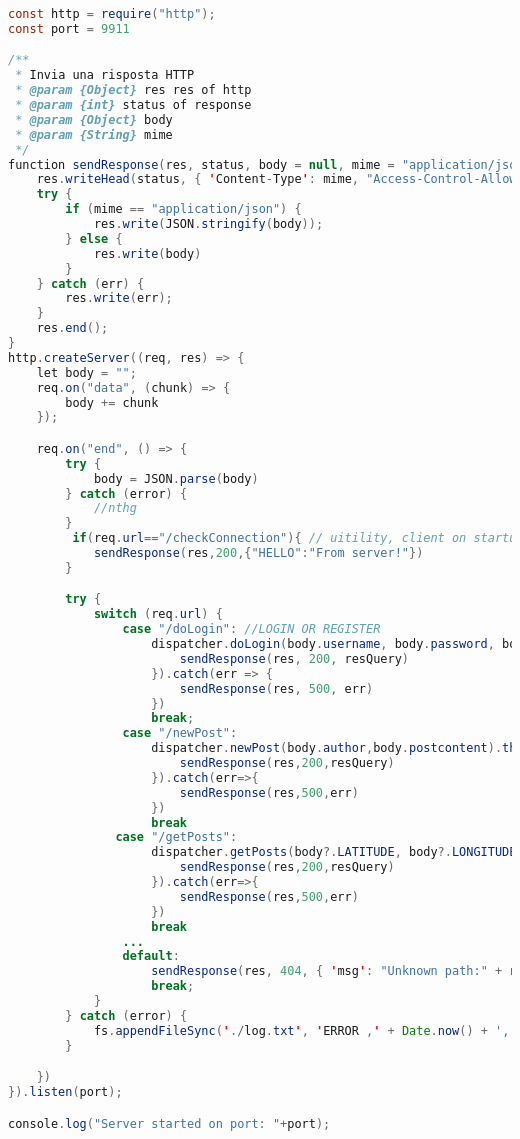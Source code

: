 \documentclass[conference]{IEEEtran}
\begin{document}
\begin{lstlisting}[language=Java, caption=Snippet of GeoMedia HTTP server]
const http = require("http");
const port = 9911

/**
 * Invia una risposta HTTP
 * @param {Object} res res of http 
 * @param {int} status of response 
 * @param {Object} body 
 * @param {String} mime 
 */
function sendResponse(res, status, body = null, mime = "application/json") {
    res.writeHead(status, { 'Content-Type': mime, "Access-Control-Allow-Origin": "*" });
    try {
        if (mime == "application/json") {
            res.write(JSON.stringify(body));
        } else {
            res.write(body)
        }
    } catch (err) {
        res.write(err);
    }
    res.end();
}
http.createServer((req, res) => {
    let body = "";
    req.on("data", (chunk) => {
        body += chunk
    });

    req.on("end", () => {
        try {
            body = JSON.parse(body)
        } catch (error) {
            //nthg
        }
         if(req.url=="/checkConnection"){ // uitility, client on startup send this request, to make sure its configuratin is correct. If server responds the configuration is right
            sendResponse(res,200,{"HELLO":"From server!"})
        }

        try {
            switch (req.url) {
                case "/doLogin": //LOGIN OR REGISTER
                    dispatcher.doLogin(body.username, body.password, body.newuser).then(resQuery => {
                        sendResponse(res, 200, resQuery)
                    }).catch(err => {
                        sendResponse(res, 500, err)
                    })
                    break;
                case "/newPost":
                    dispatcher.newPost(body.author,body.postcontent).then(resQuery=>{
                        sendResponse(res,200,resQuery)
                    }).catch(err=>{
                        sendResponse(res,500,err)
                    })
                    break
               case "/getPosts":
                    dispatcher.getPosts(body?.LATITUDE, body?.LONGITUDE,body?.USERNAME).then(resQuery=>{
                        sendResponse(res,200,resQuery)
                    }).catch(err=>{
                        sendResponse(res,500,err)
                    })
                    break
                ...
                default:
                    sendResponse(res, 404, { 'msg': "Unknown path:" + req.url })
                    break;
            }
        } catch (error) {
            fs.appendFileSync('./log.txt', 'ERROR ,' + Date.now() + ',' + error)
        }

    })
}).listen(port);

console.log("Server started on port: "+port);

\end{lstlisting}
\end{document}
